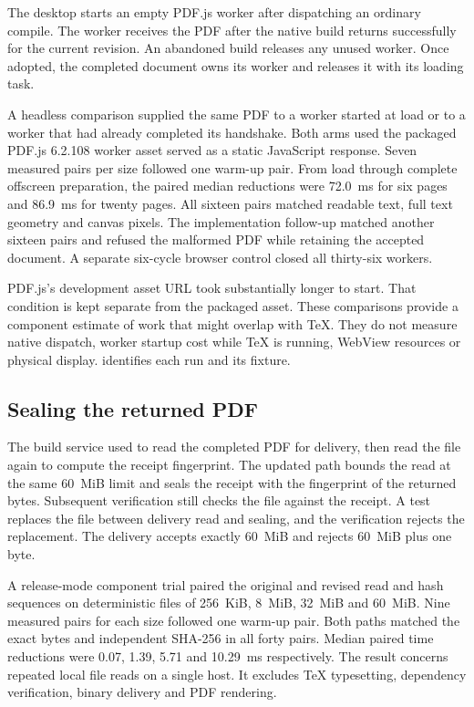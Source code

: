 The desktop starts an empty PDF.js worker after dispatching an ordinary
compile. The worker receives the PDF after the native build returns
successfully for the current revision. An abandoned build releases any
unused worker. Once adopted, the completed document owns its worker
and releases it with its loading task.

A headless comparison supplied the same PDF to a worker started at load
or to a worker that had already completed its handshake. Both arms used
the packaged PDF.js 6.2.108 worker asset served as a static JavaScript
response. Seven measured pairs per size followed one warm-up pair.
From load through complete offscreen preparation, the paired median
reductions were 72.0~ms for six pages and 86.9~ms for twenty pages.
All sixteen pairs matched readable text, full text geometry and canvas
pixels. The implementation follow-up matched another sixteen pairs
and refused the malformed PDF while retaining the accepted document.
A separate six-cycle browser control closed all thirty-six workers.

PDF.js's development asset URL took substantially longer to start.
That condition is kept separate from the packaged asset. These comparisons
provide a component estimate of work that might overlap with TeX. They
do not measure native dispatch, worker startup cost while TeX is running,
WebView resources or physical display.
 identifies each
run and its fixture.

\subsection{Sealing the returned PDF}

The build service used to read the completed PDF for delivery, then
read the file again to compute the receipt fingerprint. The updated path
bounds the read at the same 60~MiB limit and seals the receipt with the
fingerprint of the returned bytes. Subsequent verification still checks
the file against the receipt. A test replaces the file between delivery
read and sealing, and the verification rejects the replacement. The
delivery accepts exactly 60~MiB and rejects 60~MiB plus one byte.

A release-mode component trial paired the original and revised read and
hash sequences on deterministic files of 256~KiB, 8~MiB, 32~MiB and
60~MiB. Nine measured pairs for each size followed one warm-up pair.
Both paths matched the exact bytes and independent SHA-256 in all forty
pairs. Median paired time reductions were 0.07, 1.39, 5.71 and 10.29~ms
respectively. The result concerns repeated local file reads on a single
host. It excludes TeX typesetting, dependency verification, binary
delivery and PDF rendering.

